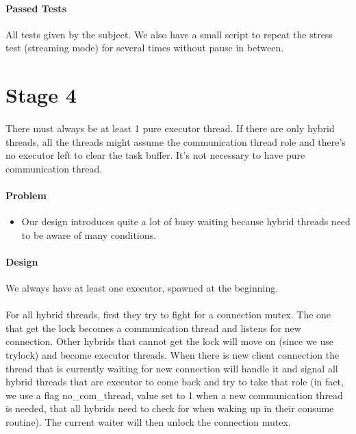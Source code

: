 \documentclass{article}
\begin{document}
\paragraph{Passed Tests} All tests given by the subject. We also have a small script to repeat the stress test (streaming mode) for several times without pause in between.

\section{Stage 4}
\paragraph{} There must always be at least 1 pure executor thread. If there are only hybrid threads, all the threads might assume the communication thread role and there's no executor left to clear the task buffer. It's not necessary to have pure communication thread.

\paragraph{Problem}
\begin{itemize}
\item Our design introduces quite a lot of busy waiting because hybrid threads need to be aware of many conditions.
\end{itemize}

\paragraph{Design} We always have at least one executor, spawned at the beginning.
\paragraph{} For all hybrid threads, first they try to fight for a connection mutex. The one that get the lock becomes a communication thread and listens for new connection. Other hybrids that cannot get the lock will move on (since we use trylock) and become executor threads. When there is new client connection the thread that is currently waiting for new connection will handle it and signal all hybrid threads that are executor to come back and try to take that role (in fact, we use a flag no\_com\_thread, value set to 1 when a new communication thread is needed, that all hybrids need to check for when waking up in their consume routine). The current waiter will then unlock the connection mutex.
\end{document}
